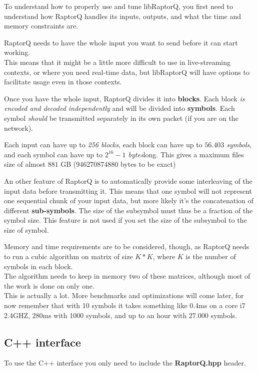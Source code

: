 \documentclass[11pt,a4paper]{refart}
\begin{document}
To understand how to properly use and tune libRaptorQ, you first need to understand how RaptorQ handles its inputs, outputs, and what the time and memory
constraints are.

RaptorQ needs to have the whole input you want to send before it can start working.\\
This means that it might be a little more difficult to use in live-streaming contexts, or where you need real-time data, but libRaptorQ will have options to
facilitate usage even in those contexts.

Once you have the whole input, RaptorQ divides it into \textbf{blocks}. Each block \textit{is encoded and decoded independently} and will be divided into \textbf{symbols}. Each symbol \textit{should}
be transmitted separately in its own packet (if you are on the network).

Each input can have up to \textit{256 blocks}, each block can have up to \textit{$56.403$ symbols}, and each
symbol can have up to \textit{$2^{16}-1$ bytes}long. This gives a maximum files size of almost $881$ GB (946270874880 bytes to be exact)

An other feature of RaptorQ is to automatically provide some interleaving of the input data before transmitting it. This means that one symbol will not
represent one sequential chunk of your input data, but more likely it's the concatenation of different \textbf{sub-symbols}. The size of the subsymbol must thus
be a fraction of the symbol size. This feature is not used if you set the size of the subsymbol to the size of symbol.


Memory and time requirements are to be considered, though, as RaptorQ needs to run a cubic algorithm on matrix of size $K*K$, where $K$ is the number of
symbols in each block.\\
The algorithm needs to keep in memory two of these matrices, although most of the work is done on only one.\\
This is actually a lot. More benchmarks and optimizations will come later, for now remember that with 10 symbols it takes something like 0.4ms on a core i7 2.4GHZ, 280ms with 1000 symbols, and up to an hour with 27.000 symbols.


\subsection{C++ interface}
To use the C++ interface you only need to include the \textbf{RaptorQ.hpp} header.
\end{document}
